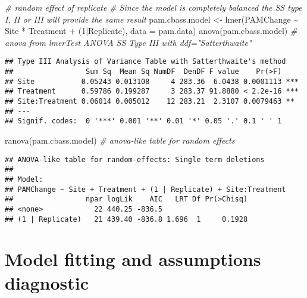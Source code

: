 \documentclass[
]{article}
\newenvironment{Shaded}{\begin{snugshade}}{\end{snugshade}}
\newcommand{\AttributeTok}[1]{\textcolor[rgb]{0.77,0.63,0.00}{#1}}
\newcommand{\CommentTok}[1]{\textcolor[rgb]{0.56,0.35,0.01}{\textit{#1}}}
\newcommand{\DecValTok}[1]{\textcolor[rgb]{0.00,0.00,0.81}{#1}}
\newcommand{\FunctionTok}[1]{\textcolor[rgb]{0.00,0.00,0.00}{#1}}
\newcommand{\NormalTok}[1]{#1}
\newcommand{\OtherTok}[1]{\textcolor[rgb]{0.56,0.35,0.01}{#1}}
\newcommand{\SpecialCharTok}[1]{\textcolor[rgb]{0.00,0.00,0.00}{#1}}
\begin{document}
\begin{Shaded}
\begin{Highlighting}[]
\CommentTok{\# random effect of replicate }
\CommentTok{\# Since the model is completely balanced the SS type I, II or III will provide the same result}
\NormalTok{pam.cbass.model }\OtherTok{\textless{}{-}} \FunctionTok{lmer}\NormalTok{(PAMChange }\SpecialCharTok{\textasciitilde{}}\NormalTok{ Site }\SpecialCharTok{*}\NormalTok{ Treatment }\SpecialCharTok{+}\NormalTok{ (}\DecValTok{1}\SpecialCharTok{|}\NormalTok{Replicate), }\AttributeTok{data =}\NormalTok{ pam.data)}
\FunctionTok{anova}\NormalTok{(pam.cbass.model) }\CommentTok{\# anova from lmerTest ANOVA SS Type III with ddf="Satterthwaite"}
\end{Highlighting}
\end{Shaded}

\begin{verbatim}
## Type III Analysis of Variance Table with Satterthwaite's method
##                 Sum Sq  Mean Sq NumDF  DenDF F value    Pr(>F)    
## Site           0.05243 0.013108     4 283.36  6.0438 0.0001113 ***
## Treatment      0.59786 0.199287     3 283.37 91.8880 < 2.2e-16 ***
## Site:Treatment 0.06014 0.005012    12 283.21  2.3107 0.0079463 ** 
## ---
## Signif. codes:  0 '***' 0.001 '**' 0.01 '*' 0.05 '.' 0.1 ' ' 1
\end{verbatim}

\begin{Shaded}
\begin{Highlighting}[]
\FunctionTok{ranova}\NormalTok{(pam.cbass.model) }\CommentTok{\# anova{-}like table for random effects}
\end{Highlighting}
\end{Shaded}

\begin{verbatim}
## ANOVA-like table for random-effects: Single term deletions
## 
## Model:
## PAMChange ~ Site + Treatment + (1 | Replicate) + Site:Treatment
##                 npar logLik    AIC   LRT Df Pr(>Chisq)
## <none>            22 440.25 -836.5                    
## (1 | Replicate)   21 439.40 -836.8 1.696  1     0.1928
\end{verbatim}

\hypertarget{model-fitting-and-assumptions-diagnostic}{%
\section{Model fitting and assumptions
diagnostic}\label{model-fitting-and-assumptions-diagnostic}}
\end{document}
